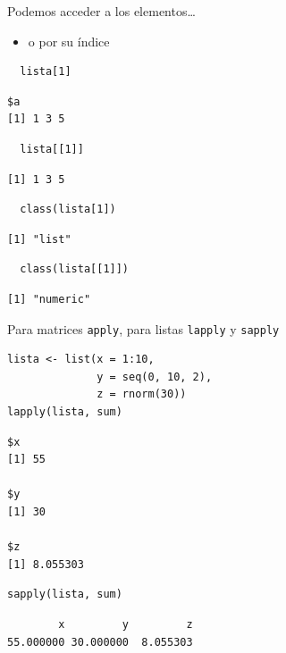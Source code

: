 \documentclass[xcolor={usenames,svgnames,dvipsnames}]{beamer}
\begin{document}
\begin{frame}[fragile,label=sec-3-1-3]{Podemos acceder a los elementos\ldots{}}
 \begin{itemize}
\item o por su índice
\end{itemize}
\lstset{language=R,label= ,caption= ,numbers=none}
\begin{lstlisting}
  lista[1]
\end{lstlisting}

\begin{verbatim}
$a
[1] 1 3 5
\end{verbatim}

\lstset{language=R,label= ,caption= ,numbers=none}
\begin{lstlisting}
  lista[[1]]
\end{lstlisting}

\begin{verbatim}
[1] 1 3 5
\end{verbatim}

\lstset{language=R,label= ,caption= ,numbers=none}
\begin{lstlisting}
  class(lista[1])
\end{lstlisting}

\begin{verbatim}
[1] "list"
\end{verbatim}

\lstset{language=R,label= ,caption= ,numbers=none}
\begin{lstlisting}
  class(lista[[1]])
\end{lstlisting}

\begin{verbatim}
[1] "numeric"
\end{verbatim}
\end{frame}

\begin{frame}[fragile,label=sec-3-1-4]{Para matrices \texttt{apply}, para listas \texttt{lapply} y \texttt{sapply}}
 \lstset{language=R,label= ,caption= ,numbers=none}
\begin{lstlisting}
lista <- list(x = 1:10,
              y = seq(0, 10, 2),
              z = rnorm(30))
lapply(lista, sum)
\end{lstlisting}

\begin{verbatim}
$x
[1] 55

$y
[1] 30

$z
[1] 8.055303
\end{verbatim}

\lstset{language=R,label= ,caption= ,numbers=none}
\begin{lstlisting}
sapply(lista, sum)
\end{lstlisting}

\begin{verbatim}
        x         y         z 
55.000000 30.000000  8.055303
\end{verbatim}
\end{frame}
\end{document}
